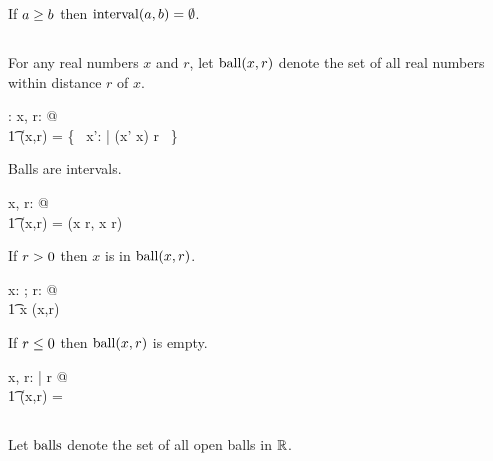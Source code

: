 \documentclass[11pt, oneside]{article}
\begin{document}
\begin{remark}
If $a \mathrel{\geq} b$ then $\operatorname{interval}(a,b) = \emptyset$.
\end{remark}

\subsection{}

For any real numbers $x$ and $r$, let $\operatorname{ball}(x,r)$ denote the set of all real numbers within distance $r$ of $x$.

\begin{axdef}
	\ballR: \R \cross \R \fun \power \R
\where
	\forall x, r: \R @ \\
	\t1	\ballR(x,r) = \{~ x': \R | \absR(x' \subR x) \ltR r ~\}
\end{axdef}

\begin{remark}
Balls are intervals.

\begin{zed}
	\forall x, r: \R @ \\
	\t1	\ballR(x,r) = \intervalR(x \subR r, x \addR r)
\end{zed}

\end{remark}

\begin{remark}
If $r \mathrel{>} 0$ then $x$ is in $\operatorname{ball}(x, r)$. 

\begin{zed}
	\forall x: \R; r: \Rpos @ \\
	\t1	x \in \ballR(x,r)
\end{zed}

\end{remark}

\begin{remark}
If $r \mathrel{\leq} 0$ then $\operatorname{ball}(x,r)$ is empty.

\begin{zed}
	\forall x, r: \R | r \leR \zeroR @ \\
	\t1	\ballR(x,r) = \emptyset
\end{zed}

\end{remark}

\subsection{}

Let $\operatorname{balls}$ denote the set of all open balls in $\mathbb{R}$.
\end{document}
